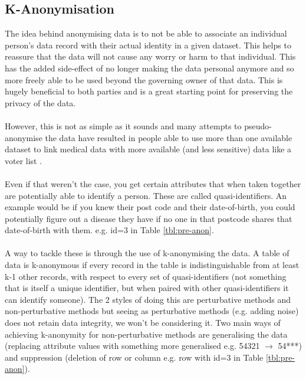 \subsection{K-Anonymisation}
The idea behind anonymising data is to not be able to associate an individual person's data record with their actual identity in a given dataset. 
This helps to reassure that the data will not cause any worry or harm to that individual. This has the added side-effect of no longer making the data personal anymore and so more freely able to be used beyond the governing owner of that data. 
This is hugely beneficial to both parties and is a great starting point for preserving the privacy of the data. 
\\ \\
However, this is not as simple as it sounds and many attempts to pseudo-anonymise the data have resulted in people able to use more than one available dataset to link medical data with more available (and less sensitive) data like a voter list \cite{failed_anonymisation}.
\\ \\
Even if that weren't the case, you get certain attributes that when taken together are potentially able to identify a person. These are called quasi-identifiers. 
An example would be if you knew their post code and their date-of-birth, you could potentially figure out a disease they have if no one in that postcode shares that date-of-birth with them. e.g. id=3 in Table \ref{tbl:pre-anon}.
\\ \\
A way to tackle these is through the use of k-anonymising the data. A table of data is k-anonymous if every record in the table is indistinguishable from at least k-1 other records, with respect to every set of quasi-identifiers (not something that is itself a unique identifier, but when paired with other quasi-identifiers it can identify someone). 
The 2 styles of doing this are perturbative methods and non-perturbative methods but seeing as perturbative methods (e.g. adding noise) does not retain data integrity, we won't be considering it. 
Two main ways of achieving k-anonymity for non-perturbative methods are generalising the data (replacing attribute values with something more generalised e.g. 54321 $\longrightarrow$ 54***) and suppression (deletion of row or column e.g. row with id=3 in Table \ref{tbl:pre-anon}).
